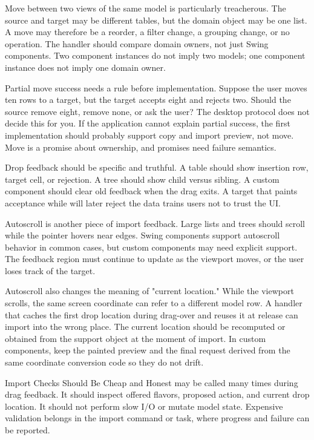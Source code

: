 Move between two views of the same model is particularly treacherous. The source and target may be different tables, but the domain object may be one list. A move may therefore be a reorder, a filter change, a grouping change, or no operation. The handler should compare domain owners, not just Swing components. Two component instances do not imply two models; one component instance does not imply one domain owner.

Partial move success needs a rule before implementation. Suppose the user moves ten rows to a target, but the target accepts eight and rejects two. Should the source remove eight, remove none, or ask the user? The desktop protocol does not decide this for you. If the application cannot explain partial success, the first implementation should probably support copy and import preview, not move. Move is a promise about ownership, and promises need failure semantics.

Drop feedback should be specific and truthful. A table should show insertion row, target cell, or rejection. A tree should show child versus sibling. A custom component should clear old feedback when the drag exits. A target that paints acceptance while  will later reject the data trains users not to trust the UI.

Autoscroll is another piece of import feedback. Large lists and trees should scroll while the pointer hovers near edges. Swing components support autoscroll behavior in common cases, but custom components may need explicit support. The feedback region must continue to update as the viewport moves, or the user loses track of the target.

Autoscroll also changes the meaning of "current location." While the viewport scrolls, the same screen coordinate can refer to a different model row. A handler that caches the first drop location during drag-over and reuses it at release can import into the wrong place. The current location should be recomputed or obtained from the support object at the moment of import. In custom components, keep the painted preview and the final request derived from the same coordinate conversion code so they do not drift.

\begin{detailbox}{Import Checks Should Be Cheap and Honest}
 may be called many times during drag feedback. It should inspect offered flavors, proposed action, and current drop location. It should not perform slow I/O or mutate model state. Expensive validation belongs in the import command or task, where progress and failure can be reported.
\end{detailbox}

